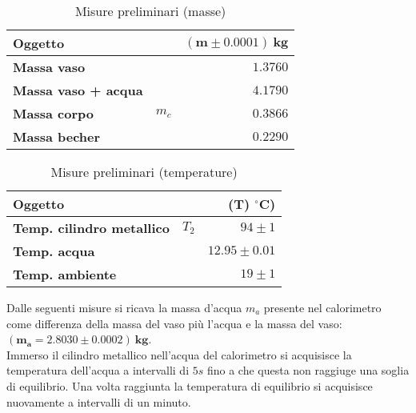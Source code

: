 \documentclass{article}
\begin{document}
	\begin{minipage}{0.4\textwidth}
		\begin{table}[H] \centering
			\begin{small}
				\begin{tabular}{@{}lrr@{}}\toprule
					\textbf{Oggetto}& &  \(\boldsymbol{(m \pm 0.0001) \SI{}{\kilogram}}\) \\ \midrule
					\textbf{Massa vaso}	&	 & \(1.3760\)   \\  \hdashline
					\textbf{Massa vaso + acqua}	&	 & \(4.1790\)   \\  \hdashline
					\textbf{Massa corpo}	& \(m_{c}\)	 & \(0.3866\)   \\  \hdashline
					\textbf{Massa becher}	&	 & \(0.2290\)   \\
					\bottomrule
				\end{tabular}
			\end{small}
			\caption{Misure preliminari (masse)}
		\end{table}
	\end{minipage}
	\begin{minipage}{0.6\textwidth}
		\begin{table}[H] \centering
			\begin{small}
				\begin{tabular}{@{}lrr@{}}\toprule
					\textbf{Oggetto}					&  			& \textbf{(\(\boldsymbol{T}\))} \(\boldsymbol{^\circ C}\))\\ \midrule
					\textbf{Temp. cilindro metallico}	& 	\(T_{2}\)		& \(94 \pm 1\)	 \\  \hdashline
					\textbf{Temp. acqua}				&					&\(12.95 \pm 0.01\)		 	 \\  \hdashline
					\textbf{Temp. ambiente}				&					& \(19 \pm 1\)		 	  \\  
					\bottomrule
				\end{tabular}
			\end{small}
			\caption{Misure preliminari (temperature)}
		\end{table}
	\end{minipage}
	\vspace{1cm}
	
	Dalle seguenti misure si ricava la massa d'acqua \(m_{a}\) presente nel calorimetro come differenza della massa del vaso più l'acqua e la massa del vaso: \(\boldsymbol{(m_{a} = 2.8030\pm 0.0002)\SI{}{\kilogram}}\). \\
	
	\noindent
	Immerso il cilindro metallico nell'acqua del calorimetro si acquisisce la temperatura dell'acqua a intervalli di \(5 s\) fino a che questa non raggiuge una soglia di equilibrio. Una volta raggiunta la temperatura di equilibrio si acquisisce nuovamente a intervalli di un minuto.
	
\end{document}
